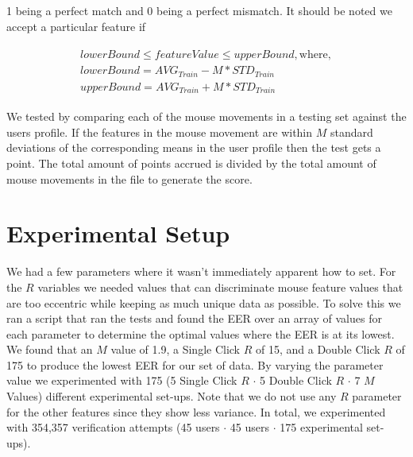 \documentclass[conference]{IEEEtran}
\begin{document}
1 being a perfect match and 0 being a perfect mismatch. It should be noted we accept a particular feature if

\begin{equation}
\begin{split}
\begin{gathered}
   lowerBound \leq featureValue \leq upperBound, \text{where},\\
   lowerBound = AVG_{Train} - M * STD_{Train}\\
   upperBound = AVG_{Train} + M * STD_{Train}
\end{gathered}
\end{split}
\end{equation}


We tested by comparing each of the mouse movements in a testing set against the users profile. If the features in the mouse movement are within $M$ standard deviations of the corresponding means in the user profile then the test gets a point. The total amount of points accrued is divided by the total amount of mouse movements in the file to generate the score.
	


\section{Experimental Setup}
We had a few parameters where it wasn’t immediately apparent how to set. For the $R$ variables we needed values that can discriminate mouse feature values that are too eccentric while keeping as much unique data as possible. To solve this we ran a script that ran the tests and found the EER over an array of values for each parameter to determine the optimal values where the EER is at its lowest. We found that an $M$ value of 1.9, a Single Click $R$ of 15, and a Double Click $R$ of 175 to produce the lowest EER for our set of data. By varying the parameter value we experimented with 175 (5 Single Click $R$ $\cdot$ 5 Double Click $R$ $\cdot$ 7 $M$ Values) different experimental set-ups. Note that we do not use any $R$ parameter for the other features since they show less variance. In total, we experimented with 354,357 verification attempts (45 users $\cdot$ 45 users $\cdot$ 175 experimental set-ups).

\bgroup
{}
\def\arraystretch{1.5}
\egroup
\end{document}
